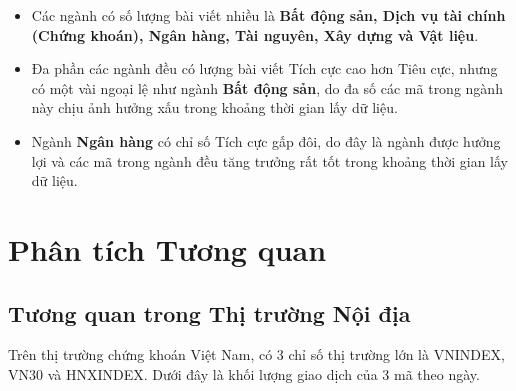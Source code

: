 \begin{itemize}
    \item Các ngành có số lượng bài viết nhiều là \textbf{Bất động sản, Dịch vụ tài chính (Chứng khoán), Ngân hàng, Tài nguyên, Xây dựng và Vật liệu}.
    \item Đa phần các ngành đều có lượng bài viết Tích cực cao hơn Tiêu cực, nhưng có một vài ngoại lệ như ngành \textbf{Bất động sản}, do đa số các mã trong ngành này chịu ảnh hưởng xấu trong khoảng thời gian lấy dữ liệu.
    \item Ngành \textbf{Ngân hàng} có chỉ số Tích cực gấp đôi, do đây là ngành được hưởng lợi và các mã trong ngành đều tăng trưởng rất tốt trong khoảng thời gian lấy dữ liệu.
\end{itemize}

\section{Phân tích Tương quan}
\subsection{Tương quan trong Thị trường Nội địa}

Trên thị trường chứng khoán Việt Nam, có 3 chỉ số thị trường lớn là VNINDEX, VN30 và HNXINDEX. Dưới đây là khối lượng giao dịch của 3 mã theo ngày.

